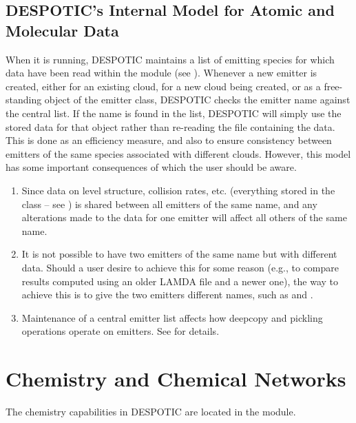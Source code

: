 \documentclass[letterpaper,10pt,english]{sphinxmanual}
\begin{document}
\section{DESPOTIC's Internal Model for Atomic and Molecular Data}
\label{data:ssec-database-internal}\label{data:despotic-s-internal-model-for-atomic-and-molecular-data}
When it is running, DESPOTIC maintains a list of emitting species for
which data have been read within the  module (see
{\hyperref[fulldoc:sssec\string-full\string-emitter]{}}). Whenever a new emitter is created, either for an
existing cloud, for a new cloud being created, or as a free-standing
object of the emitter class, DESPOTIC checks the emitter name against
the central list. If the name is found in the list, DESPOTIC will
simply use the stored data for that object rather than re-reading the
file containing the data. This is done as an efficiency measure, and
also to ensure consistency between emitters of the same species
associated with different clouds. However, this model has some
important consequences of which the user should be aware.
\begin{enumerate}
\item {} 
Since data on level structure, collision rates, etc. (everything
stored in the  class -- see {\hyperref[fulldoc:sssec\string-full\string-emitterdata]{}}) is
shared between all emitters of the same name, and any alterations
made to the data for one emitter will affect all others of the same
name.

\item {} 
It is not possible to have two emitters of the same name but with
different data. Should a user desire to achieve this for some
reason (e.g., to compare results computed using an older LAMDA file
and a newer one), the way to achieve this is to give the two
emitters different names, such as  and .

\item {} 
Maintenance of a central emitter list affects how deepcopy and
pickling operations operate on emitters. See
{\hyperref[fulldoc:sssec\string-full\string-emitterdata]{}} for details.

\end{enumerate}


\chapter{Chemistry and Chemical Networks}
\label{chemistry::doc}\label{chemistry:chemistry-and-chemical-networks}\label{chemistry:sec-chemistry}
The chemistry capabilities in DESPOTIC are located in the
 module.
\end{document}
